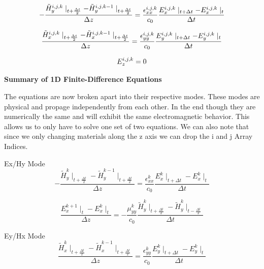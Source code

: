 \documentclass[a4paper,10pt]{article}
\begin{document}
\begin{equation*}
  - \frac{\tilde{H}_{y}^{i,j,k}\mid_{t+\frac  {\Delta t}{2}} - \tilde{H}_{y}^{i,j,k-1}\mid_{t+\frac  {\Delta t}{2}}}{\Delta z} = \frac{\epsilon_{xx}^{i,j,k}}{c_0} \frac{E_{x}^{i,j,k}\mid_{t+\Delta t} - E_{x}^{i,j,k}\mid_{t}}{\Delta t}\notag
\end{equation*}

\begin{equation*}
  \frac{\tilde{H}_{x}^{i,j,k}\mid_{t+\frac{\Delta t}{2}} - \tilde{H}_{x}^{i,j,k-1}\mid_{t+\frac  {\Delta t}{2}}}{\Delta z} = \frac{\epsilon_{yy}^{i,j,k}}{c_0} \frac{E_{y}^{i,j,k}\mid_{t+\Delta t} - E_{y}^{i,j,k}\mid_{t}}{\Delta t}\notag
\end{equation*}

\begin{equation*}
  E_{z}^{i,j,k} = 0\notag
\end{equation*}


\textbf{Summary of 1D Finite-Difference Equations}

The equations are now broken apart into their respective modes.  These modes are physical and propage independently from each other.  In the end though they are numerically the same and will exhibit the same electromagnetic behavior.   This allows us to only have to solve one set of two equations.  We can also note that since we only changing materials along the z axis we can drop the i and j Array Indices.



Ex/Hy Mode
\begin{equation}
  - \frac{\tilde{H}_{y}^{k}\mid_{t+\frac  {\Delta t}{2}} - \tilde{H}_{y}^{k-1}\mid_{t+\frac  {\Delta t}{2}}}{\Delta z} = \frac{\epsilon_{xx}^{k}}{c_0} \frac{E_{x}^{k}\mid_{t+\Delta t} - E_{x}^{k}\mid_{t}}{\Delta t}
\end{equation}

\begin{equation}
  \frac{E_{x}^{k+1}\mid_{t} - E_{x}^{k}\mid_{t}}{\Delta z} = -\frac{\mu_{yy}^{k}}{c_0} \frac{\tilde{H}_{y}^{k}\mid_{t+\frac  {\Delta t}{2}} - \tilde{H}_{y}^{k}\mid_{t-\frac{\Delta t}{2}}}{\Delta t}
\end{equation}



Ey/Hx Mode
\begin{equation}
  \label{eq:EinEyHXMode}
  \frac{\tilde{H}_{x}^{k}\mid_{t+\frac{\Delta t}{2}} - \tilde{H}_{x}^{k-1}\mid_{t+\frac  {\Delta t}{2}}}{\Delta z} = \frac{\epsilon_{yy}^{k}}{c_0} \frac{E_{y}^{k}\mid_{t+\Delta t} - E_{y}^{k}\mid_{t}}{\Delta t}
\end{equation}
\end{document}
